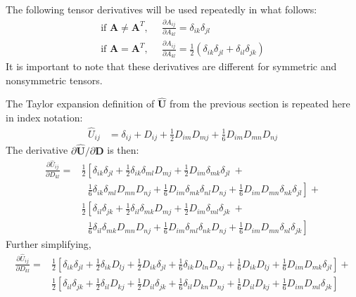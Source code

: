 The following tensor derivatives will be used repeatedly in what follows:
\begin{align}
\text{if } {\bm A} \neq {\bm A}^T\text{,}\ \ \ &\frac{\partial A_{ij}}{\partial A_{kl}} = \delta_{ik}{\delta_{jl}} \\
\text{if } {\bm A} = {\bm A}^T\text{,}\ \ \ &\frac{\partial A_{ij}}{\partial A_{kl}} = \frac{1}{2}(\delta_{ik}{\delta_{jl}} + \delta_{il}{\delta_{jk}})
\end{align}
It is important to note that these derivatives are different for symmetric and nonsymmetric tensors.

The Taylor expansion definition of $\hat{\bm U}$ from the previous section is repeated here in index notation:
\begin{align}
\hat{U}_{ij} &= \delta_{ij} + D_{ij} + \frac{1}{2}D_{im}D_{mj} + \frac{1}{6}D_{im}D_{mn}D_{nj}
\end{align}
The derivative $\partial \hat{\bm U}/{\partial {\bm D}}$ is then:
\begin{equation}
\begin{split}
\frac{\partial \hat{U}_{ij}}{\partial D_{kl}} = &\frac{1}{2}\left[\delta_{ik}\delta_{jl} + \frac{1}{2}\delta_{ik}\delta_{ml}D_{mj} + \frac{1}{2}D_{im}\delta_{mk}\delta_{jl}\  + \right.\\
&\ \left.\ \ \frac{1}{6}\delta_{ik}\delta_{ml}D_{mn}D_{nj} + \frac{1}{6}D_{im}\delta_{mk}\delta_{nl}D_{nj} + \frac{1}{6}D_{im}D_{mn}\delta_{nk}\delta_{jl}\right] + \\
&\frac{1}{2}\left[\delta_{il}\delta_{jk} + \frac{1}{2}\delta_{il}\delta_{mk}D_{mj} + \frac{1}{2}D_{im}\delta_{ml}\delta_{jk}\  + \right.\\
&\ \left.\ \ \frac{1}{6}\delta_{il}\delta_{mk}D_{mn}D_{nj} + \frac{1}{6}D_{im}\delta_{ml}\delta_{nk}D_{nj} + \frac{1}{6}D_{im}D_{mn}\delta_{nl}\delta_{jk}\right]
\end{split}
\end{equation}
Further simplifying,
\begin{align}
\frac{\partial \hat{U}_{ij}}{\partial D_{kl}} = &\frac{1}{2}\left[\delta_{ik}\delta_{jl} + \frac{1}{2}\delta_{ik}D_{lj} + \frac{1}{2}D_{ik}\delta_{jl} + \frac{1}{6}\delta_{ik}D_{ln}D_{nj} + \frac{1}{6}D_{ik}D_{lj} + \frac{1}{6}D_{im}D_{mk}\delta_{jl}\right] + \\
&\frac{1}{2}\left[\delta_{il}\delta_{jk} + \frac{1}{2}\delta_{il}D_{kj} + \frac{1}{2}D_{il}\delta_{jk} + \frac{1}{6}\delta_{il}D_{kn}D_{nj} + \frac{1}{6}D_{il}D_{kj} + \frac{1}{6}D_{im}D_{ml}\delta_{jk}\right]
\end{align}

